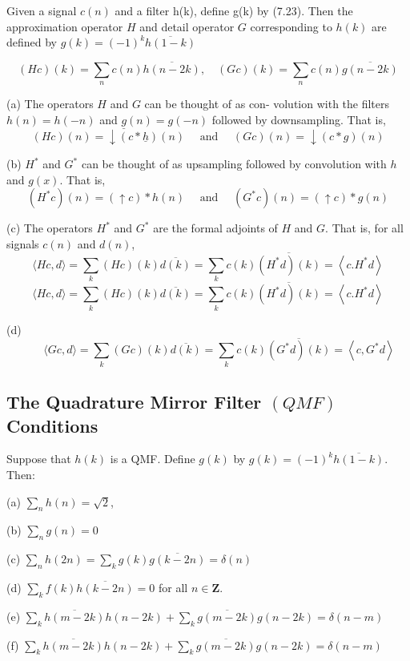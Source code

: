\begin{definition}
Given a signal $c(n)$ and a filter h(k), define g(k) by (7.23).
Then the approximation operator $H$ and detail operator $G$ corresponding to $h(k)$ are defined by
$g(k)=(-1)^{k} \overline{h(1-k)}$

$$
(H c)(k)=\sum_{n} c(n) \overline{h(n-2 k)}, \quad(G c)(k)=\sum_{n} c(n) \overline{g(n-2 k)}
$$
\end{definition}

(a) The operators $H$ and $G$ can be thought of as con-
volution with the filters $h(n)=h(-n)$ and $\underline{g}(n)=g(-n)$ followed by
downsampling. That is,
$$
(H c)(n)=\downarrow(c * \underline{h})(n) \quad \text { and } \quad(G c)(n)=\downarrow(c * g)(n)
$$

(b) $H^{*}$ and $G^{*}$ can be thought of as upsampling followed by convolution
with $h$ and $g(x)$. That is,
$$
\left(H^{*} c\right)(n)=(\uparrow c) * h(n) \quad \text { and } \quad\left(G^{*} c\right)(n)=(\uparrow c) * g(n)
$$

(c) The operators $H^{*}$ and $G^{*}$ are the formal adjoints of $H$ and $G .$ That is, for all signals $c(n)$ and $d(n)$,
$$
\langle H c, d\rangle=\sum_{k}(H c)(k) \overline{d(k)}=\sum_{k} c(k) \overline{\left(H^{*} d\right)(k)}=\left\langle c . H^{*} d\right\rangle
$$
$$
\langle H c, d\rangle=\sum_{k}(H c)(k) \overline{d(k)}=\sum_{k} c(k) \overline{\left(H^{*} d\right)(k)}=\left\langle c . H^{*} d\right\rangle
$$

(d)
$$
 {\qquad\langle G c, d\rangle=\sum_{k}(G c)(k) \overline{d(k)}=\sum_{k} c(k) \overline{\left(G^{*} d\right)(k)}=\left\langle c, G^{*} d\right\rangle}
$$

\subsection{The Quadrature Mirror Filter $(Q M F)$ Conditions}

\begin{theorem}
Suppose that $h(k)$ is a QMF. Define $g(k)$ by $g(k)=(-1)^{k} \overline{h(1-k)}$. Then:

(a) $\sum_{n} h(n)=\sqrt{2}$,

(b) $\sum_{n} g(n)=0$

(c) $\sum_{n} h(2 n)=\sum_{k} g(k) \overline{g(k-2 n)}=\delta(n)$

(d) $\sum_{k} f(k) \overline{h(k-2 n)}=0$ for all $n \in \mathbf{Z}$.

(e) $\sum_{k} \overline{h(m-2 k)} h(n-2 k)+\sum_{k} \overline{g(m-2 k)} g(n-2 k)=\delta(n-m)$

(f) $\sum_{k} \overline{h(m-2 k)} h(n-2 k)+\sum_{k} \overline{g(m-2 k)} g(n-2 k)=\delta(n-m)$
\end{theorem}

